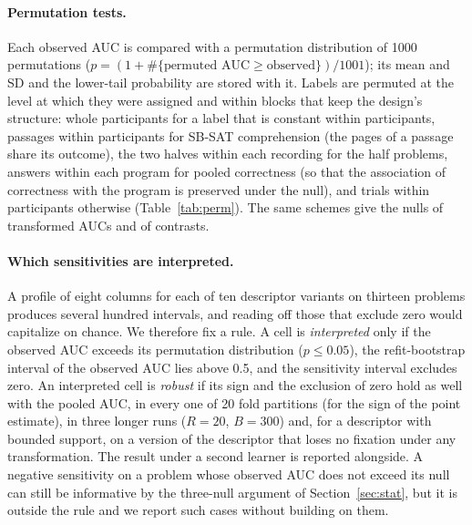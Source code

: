 \paragraph{Permutation tests.} Each observed AUC is compared with a permutation distribution \citep{ojala2010permutation} of 1000 permutations ($p = (1 + \#\{\text{permuted AUC} \geq \text{observed}\})/1001$); its mean and SD and the lower-tail probability are stored with it. Labels are permuted at the level at which they were assigned and within blocks that keep the design's structure: whole participants for a label that is constant within participants, passages within participants for SB-SAT comprehension (the pages of a passage share its outcome), the two halves within each recording for the half problems, answers within each program for pooled correctness (so that the association of correctness with the program is preserved under the null), and trials within participants otherwise (Table~\ref{tab:perm}). The same schemes give the nulls of transformed AUCs and of contrasts.

\paragraph{Which sensitivities are interpreted.} A profile of eight columns for each of ten descriptor variants on thirteen problems produces several hundred intervals, and reading off those that exclude zero would capitalize on chance. We therefore fix a rule. A cell is \emph{interpreted} only if the observed AUC exceeds its permutation distribution ($p \leq 0.05$), the refit-bootstrap interval of the observed AUC lies above 0.5, and the sensitivity interval excludes zero. An interpreted cell is \emph{robust} if its sign and the exclusion of zero hold as well with the pooled AUC, in every one of 20 fold partitions (for the sign of the point estimate), in three longer runs ($R = 20$, $B = 300$) and, for a descriptor with bounded support, on a version of the descriptor that loses no fixation under any transformation. The result under a second learner is reported alongside. A negative sensitivity on a problem whose observed AUC does not exceed its null can still be informative by the three-null argument of Section~\ref{sec:stat}, but it is outside the rule and we report such cases without building on them.

\begin{table}[!htbp]
\centering\small
\caption{Permutation schemes. For each problem: the unit at which the label was assigned, the unit whose labels are permuted, the block within which they are permuted, and what every permutation preserves.}
\label{tab:perm}
\resizebox{\linewidth}{!}{}
\end{table}

